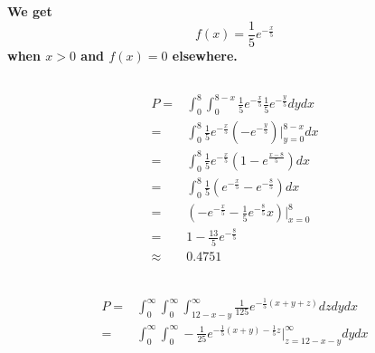 \documentclass{article}
\begin{document}
    \section{}
        \paragraph{
            We get 
            $$f(x)=\frac{1}{5}e^{-\frac{x}{5}}$$
            when $x>0$ and $f(x)=0$ elsewhere.
        }
        \subsection{}
            \paragraph{
                \begin{equation*}
                    \begin{split}
                        P=&\int_0^8\int_0^{8-x} \frac{1}{5}e^{-\frac{x}{5}}\frac{1}{5}e^{-\frac{y}{5}} dydx\\
                            =&\int_0^8\frac{1}{5}e^{-\frac{x}{5}}(-e^{-\frac{y}{5}})|_{y=0}^{8-x}dx\\
                            =&\int _0^8 \frac{1}{5}e^{-\frac{x}{5}}(1-e^{\frac{x-8}{5}})dx\\
                            =&\int_0^8\frac{1}{5}(e^{-\frac{x}{5}}-e^{-\frac{8}{5}})dx\\
                            =&(-e^{-\frac{x}{5}}-\frac{1}{5}e^{-\frac{8}{5}}x)|_{x=0}^8\\
                            =& 1-\frac{13}{5}e^{-\frac{8}{5}}\\
                            \approx&0.4751\\
                    \end{split}
                \end{equation*}
            }
        \subsection{}
            \paragraph{
                \begin{equation*}
                    \begin{split}
                        P=&\int _0^\infty \int _0 ^\infty \int_{12-x-y} ^\infty \frac{1}{125}e^{-\frac{1}{5}(x+y+z)}dzdydx\\
                            =&\int _0^\infty \int _0 ^\infty -\frac{1}{25}e^{-\frac{1}{5}(x+y)-\frac{1}{5}z}|_{z=12-x-y}^\infty dydx
                    \end{split}
                \end{equation*}
            }
\end{document}
